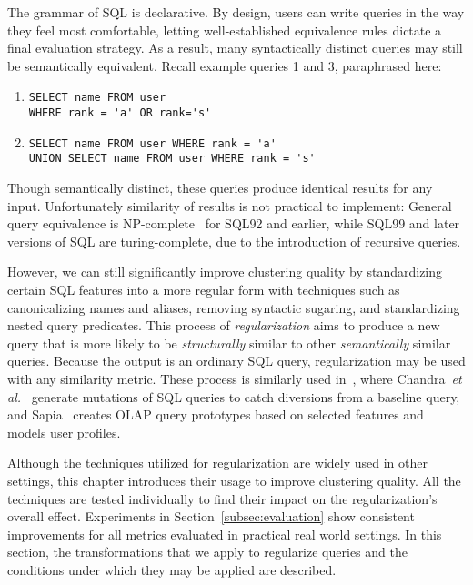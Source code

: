 The grammar of SQL is declarative. By design, users can write queries in the way they feel most comfortable, letting well-established equivalence rules dictate a final evaluation strategy.  
As a result, many syntactically distinct queries may still be semantically equivalent.  
Recall example queries 1 and 3, paraphrased here:

{\footnotesize
\begin{enumerate}
\item\begin{verbatim}
SELECT name FROM user 
WHERE rank = 'a' OR rank='s'
\end{verbatim}
\item\begin{verbatim}
SELECT name FROM user WHERE rank = 'a'
UNION SELECT name FROM user WHERE rank = 's'
\end{verbatim}
\end{enumerate}
}

Though semantically distinct, these queries produce identical results for any input.  
Unfortunately similarity of results is not practical to implement: General query equivalence is NP-complete~\cite{Chandra:1977:OIC:800105.803397} for SQL92 and earlier, while SQL99 and later versions of SQL are turing-complete, due to the introduction of recursive queries.  

However, we can still significantly improve clustering quality by standardizing certain SQL features into a more regular form with techniques such as canonicalizing names and aliases, removing syntactic sugaring, and standardizing nested query predicates.
This process of \emph{regularization} aims to produce a new query that is more likely to be \emph{structurally} similar to other \emph{semantically} similar queries. 
Because the output is an ordinary SQL query, regularization may be used with any similarity metric.
These process is similarly used in~\cite{Chandra:2016:PMA:3007263.3007304, sapia1999modeling}, where Chandra~\textit{et al.}~\cite{Chandra:2016:PMA:3007263.3007304} generate mutations of SQL queries to catch diversions from a baseline query, and Sapia~\cite{sapia1999modeling} creates OLAP query prototypes based on selected features and models user profiles.

Although the techniques utilized for regularization are widely used in other settings, this chapter introduces their usage to improve clustering quality.
All the techniques are tested individually to find their impact on the regularization's overall effect.
Experiments in Section~\ref{subsec:evaluation} show consistent improvements for all metrics evaluated in practical real world settings.
In this section, the transformations that we apply to regularize queries and the conditions under which they may be applied are described.  

